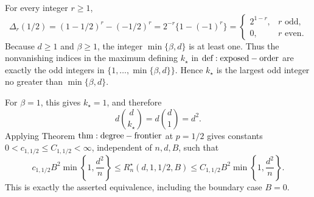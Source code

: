 For every integer \(r\ge1\),
\[
\Delta_r(1/2)=(1-1/2)^r-(-1/2)^r
=2^{-r}\{1-(-1)^r\}
=\begin{cases}
2^{1-r},&r\text{ odd},\\
0,&r\text{ even}.
\end{cases}
\]
Because \(d\ge1\) and \(\beta\ge1\), the integer \(\min\{\beta,d\}\) is at least one. Thus the nonvanishing indices in the maximum defining \(k_\star\) in \({\rm def:exposed-order}\) are exactly the odd integers in \(\{1,\ldots,\min\{\beta,d\}\}\). Hence \(k_\star\) is the largest odd integer no greater than \(\min\{\beta,d\}\).

For \(\beta=1\), this gives \(k_\star=1\), and therefore
\[
d\binom d{k_\star}=d\binom d1=d^2.
\]
Applying Theorem \({\rm thm:degree-frontier}\) at \(p=1/2\) gives constants \(0<c_{1,1/2}\le C_{1,1/2}<\infty\), independent of \(n,d,B\), such that
\[
c_{1,1/2}B^2\min\!\left\{1,\frac{d^2}{n}\right\}
\le R_n^\star(d,1,1/2,B)
\le C_{1,1/2}B^2\min\!\left\{1,\frac{d^2}{n}\right\}.
\]
This is exactly the asserted equivalence, including the boundary case \(B=0\).
